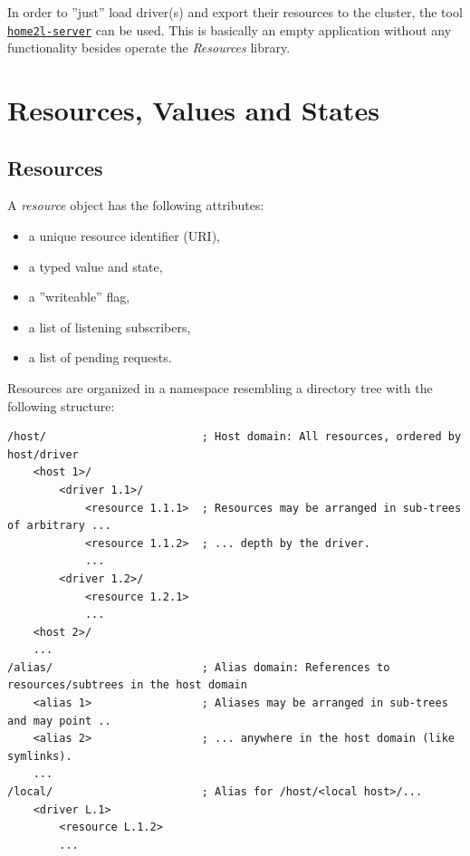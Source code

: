 \documentclass[12pt,english,parskip=half]{scrreprt}
\newcommand{\idx}[1]{#1\index{#1}}
\newcommand{\toolref}[1]{\hyperref[tool:#1]{\texttt{\idx{#1}}}}
\begin{document}
In order to ''just'' load driver(s) and export their resources to the cluster,
the tool \toolref{home2l-server} can be used.
This is basically an empty application without any functionality besides operate
the \emph{Resources} library.





\section{Resources, Values and States}
\label{sec:resources-resources}


\subsection{Resources}

A \emph{resource} object has the following attributes:

\begin{itemize}
\item
  a unique resource identifier (URI),
\item
  a typed value and state,
\item
  a ''writeable'' flag,
\item
  a list of listening subscribers,
\item
  a list of pending requests.
\end{itemize}

Resources are organized in a namespace resembling a directory tree with
the following structure:

\begin{lstlisting}
/host/                        ; Host domain: All resources, ordered by host/driver
    <host 1>/
        <driver 1.1>/
            <resource 1.1.1>  ; Resources may be arranged in sub-trees of arbitrary ...
            <resource 1.1.2>  ; ... depth by the driver.
            ...
        <driver 1.2>/
            <resource 1.2.1>
            ...
    <host 2>/
    ...
/alias/                       ; Alias domain: References to resources/subtrees in the host domain
    <alias 1>                 ; Aliases may be arranged in sub-trees and may point ..
    <alias 2>                 ; ... anywhere in the host domain (like symlinks).
    ...
/local/                       ; Alias for /host/<local host>/...
    <driver L.1>
        <resource L.1.2>
        ...
\end{lstlisting}
\end{document}
